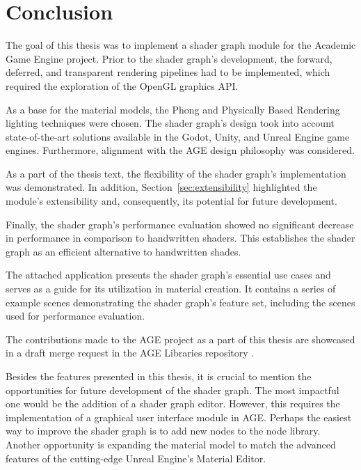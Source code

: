 \documentclass[
  digital,     %
  oneside,     %
  nosansbold,  %
  nocolorbold, %
  lof,         %
  lot,         %
]{fithesis4}
\begin{document}
\chapter*{Conclusion}
The goal of this thesis was to implement a shader graph module for the Academic Game Engine
project. Prior to the shader graph's development, the forward, deferred, and transparent rendering pipelines had to be
implemented, which required the exploration of the OpenGL graphics API.

As a base for the material models, the Phong and Physically Based Rendering lighting techniques were chosen.
The shader graph's design took into account state-of-the-art solutions available in the Godot, Unity,
and Unreal Engine game engines. Furthermore, alignment with the AGE design philosophy
was considered.

As a part of the thesis text, the flexibility of the shader graph's implementation was demonstrated.
In addition, Section~\ref{sec:extensibility} highlighted the module's extensibility and, consequently,
its potential for future development.

Finally, the shader graph's performance evaluation showed no significant decrease in performance
in comparison to handwritten shaders. This establishes the shader graph as an efficient alternative
to handwritten shades.

The attached application presents the shader graph's essential use cases and serves as a guide for
its utilization in material creation.
It contains a series of example scenes demonstrating the shader graph's feature set,
including the scenes used for performance evaluation.

The contributions made to the AGE project as a part of this thesis are showcased in
a draft merge request in the AGE Libraries repository \cite{age-libraries-mr}.

Besides the features presented in this thesis, it is crucial to mention
the opportunities for future development of the shader graph.
The most impactful one would be the addition of a shader graph editor.
However, this requires the implementation of a graphical user interface module in AGE.
Perhaps the easiest way to improve the shader graph is to add new nodes to the node library.
Another opportunity is expanding the material model to match the advanced features
of the cutting-edge Unreal Engine's Material Editor.

\appendix %
\end{document}

